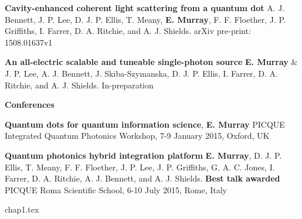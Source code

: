 \documentclass[12pt, oneside]{book}
\begin{document}
\small \textbf{Cavity-enhanced coherent light scattering from a quantum dot} A.
J. Bennett, J. P. Lee, D. J. P. Ellis, T. Meany, \textbf{E. Murray}, F. F.
Floether, J. P. Griffiths, I. Farrer, D. A. Ritchie, and A. J. Shields. \newline
arXiv pre-print: 1508.01637v1

\small \textbf{An all-electric scalable and tuneable single-photon source}
\textbf{E. Murray} \& J. P. Lee, A. J. Bennett, J. Skiba-Szymanska, D. J. P. Ellis, I. Farrer, D. A. Ritchie, and A. J. Shields. \newline
In-preparation


\large\textbf{Conferences}

\small \textbf{Quantum dots for quantum information science}, \newline
\textbf{E. Murray} \newline PICQUE Integrated Quantum Photonics Workshop, 7-9
January 2015, Oxford, UK

\small \textbf{Quantum photonics hybrid integration platform} \newline
\textbf{E. Murray}, D. J. P. Ellis, T. Meany, F. F. Floether, J. P. Lee, J. P.
Griffiths, G. A. C. Jones, I. Farrer, D. A. Ritchie, A. J. Bennett, and A. J.
Shields. \newline \textbf{Best talk awarded} PICQUE Roma Scientific School, 6-10
July 2015, Rome, Italy

\newpage \tableofcontents

{chap1.tex}

 {}
\end{document}

